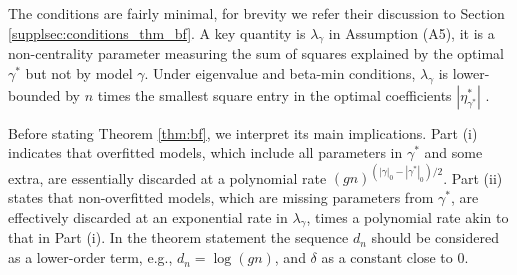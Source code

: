 The conditions are fairly minimal, for brevity we refer their discussion to Section \ref{supplsec:conditions_thm_bf}.
A key quantity is $\lambda_\gamma$ in Assumption (A5), it is a non-centrality parameter measuring the sum of squares explained by the optimal $\gamma^*$ but not by model $\gamma$.
Under eigenvalue and beta-min conditions, $\lambda_\gamma$ is lower-bounded by $n$ times the smallest square entry in the optimal coefficients $|\eta_{\gamma^*}^*|$  \citep[see, e.g.,][Sections 2.2 and 5.4]{rossell:2022}. 





Before stating Theorem \ref{thm:bf}, we interpret its main implications.
Part (i) indicates that overfitted models, which include all parameters in $\gamma^*$ and some extra, are essentially discarded at a polynomial rate $(gn)^{(|\gamma|_0 - |\gamma^*|_0)/2}$. 
Part (ii) states that non-overfitted models, which are missing parameters from $\gamma^*$,   are effectively discarded at an exponential rate in $\lambda_\gamma$, times a polynomial rate akin to that in Part (i). 
In the theorem statement the sequence $d_n$ should be considered as a lower-order term, e.g., $d_n= \log(gn)$, and $\delta$ as a constant close to 0.

